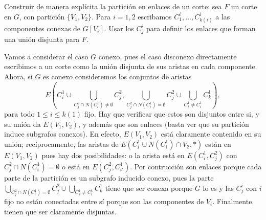 \documentclass[../main.tex]{subfiles}
\begin{document}
\begin{exercise}
Construir de manera explícita la partición en enlaces de un corte: sea $F$ un corte en $G$, con partición $\{V_1, V_2\}$. Para $i = 1,2$ escribamos $C_1^i, \ldots, C^i_{k(i)}$ a las componentes conexas de $G[V_i]$. Usar los $C_j^i$ para definir los enlaces que forman una unión disjunta para $F$.
\end{exercise}
\begin{solution}
Vamos a considerar el caso $G$ conexo, pues el caso disconexo directamente escribimos a un corte como la unión disjunta de sus aristas en cada componente. Ahora, si $G$ es conexo consideremos los conjuntos de aristas
$$
E(C_i^1 \cup \bigcup_{C_j^2 \cap N (C_i^1) \neq \emptyset} C_j^2, \bigcup_{C_j^2 \cap N(C_i^1) = \emptyset} C_j^2 \cup \bigcup_{C_k^1 \neq C_i^1} C_{k}^1),
$$
para todo $1 \leq i \leq k(1)$ fijo. Hay que verificar que estos son disjuntos entre si, y su unión da $E(V_1,V_2)$, y además que son enlaces (basta ver que su partición induce subgrafos conexos). En efecto, $E(V_1,V_2)$ está claramente contenido en su unión; recíprocamente, las aristas de $E(C_i^1 \cup N (C_i^1)\cap V_2, *)$ están en $E(V_1,V_2)$ pues hay dos posibilidades: o la arista está en $E(C_i^1, C_j^2)$ con $C_j^2 \cap N (C_i^1) = \emptyset$ o está en $E(C_j^2,C_{i'}^1)$. Por contrucción son enlaces porque cada parte de la partición es un subgrafo inducido conexo, pues la parte $\bigcup_{C_j^2 \cap N(C_i^1) = \emptyset} C_j^2 \cup \bigcup_{C_k^1 \neq C_i^1} C_{k}^1$ tiene que ser conexa porque $G$ lo es y las $C_j^i$ con $i$ fijo no están conectadas entre sí porque son las componentes de $V_i$. Finalmente, tienen que ser claramente disjuntas.
\end{solution}
\end{document}
